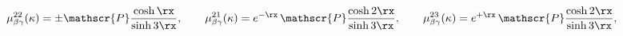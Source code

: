 \begin{equation}
\mu_{\beta\gamma}^{22}(\kappa) = \pm\mathscr{P}\frac{\cosh \rx}{\sinh 3\rx},
\qquad
\mu_{\beta\gamma}^{21}(\kappa)=e^{- \rx}\,\mathscr{P}\frac{\cosh 2\rx}{\sinh 3\rx},
\qquad
\mu_{\beta\gamma}^{23}(\kappa)=e^{+\rx}\,\mathscr{P}\frac{\cosh 2\rx}{\sinh 3\rx},
\label{sgh}
\end{equation}

